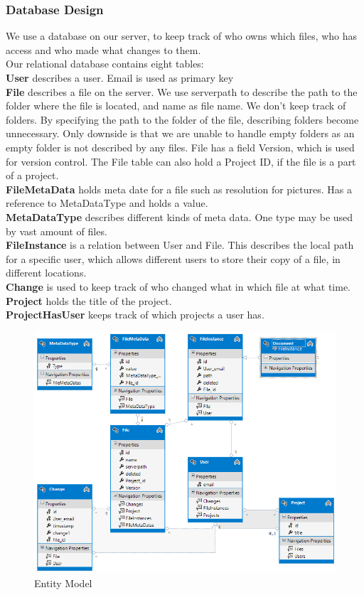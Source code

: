 \subsubsection{Database Design}
We use a database on our server, to keep track of who owns which files, who has access and who made what changes to them.\\
Our relational database contains eight tables:\\
\textbf{User} describes a user. Email is used as primary key\\
\textbf{File} describes a file on the server. We use serverpath to describe the path to the folder where the file is located, and name as file name. We don't keep track of folders. By specifying the path to the folder of the file, describing folders become unnecessary. Only downside is that we are unable to handle empty folders as an empty folder is not described by any files. File has a field Version, which is used for version control. The File table can also hold a Project ID, if the file is a part of a project.\\
\textbf{FileMetaData} holds meta date for a file such as resolution for pictures. Has a reference to MetaDataType and holds a value.\\
\textbf{MetaDataType} describes different kinds of meta data. One type may be used by vast amount of files.\\
\textbf{FileInstance} is a relation between User and File. This describes the local path for a specific user, which allows different users to store their copy of a file, in different locations.\\
\textbf{Change} is used to keep track of who changed what in which file at what time.\\
\textbf{Project} holds the title of the project.\\
\textbf{ProjectHasUser} keeps track of which projects a user has.\\
\begin{figure}[H]
  \includegraphics[width=\textwidth,natwidth=793,natheight=635]{illustrations/entitymodel.png}
  \caption{Entity Model}
  \label{entitymodel}
\end{figure}